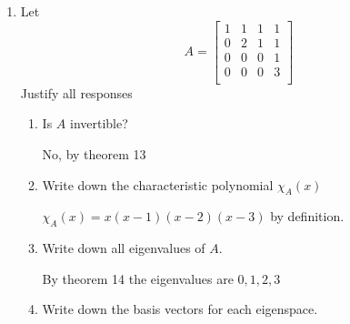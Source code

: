 \documentclass[letterpaper]{article}
\begin{document}
\begin{enumerate}
\item
Let 
\[A=\left[\begin{array}{rrrr}
1&1&1&1\\
0&2&1&1\\
0&0&0&1\\
0&0&0&3\\
\end{array}\right]\]
Justify all responses
  \begin{enumerate}
  \item
  Is $A$ invertible?

  No, by theorem 13
  \item
  Write down the characteristic polynomial $\chi_A(x)$

  $\chi_A(x)=x(x-1)(x-2)(x-3)$ by definition.
  \item
  Write down all eigenvalues of $A$.

  By theorem 14 the eigenvalues are $0,1,2,3$
  \item
  Write down the basis vectors for each eigenspace.


\end{enumerate}
\end{enumerate}
\end{document}
